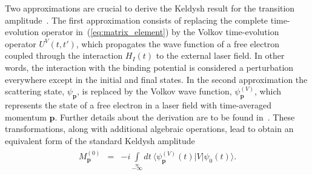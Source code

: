Two approximations are crucial to derive the Keldysh result for the
transition amplitude~\cite{Kopold_1997sfa}. The first approximation
consists of replacing the complete time-evolution operator
in~(\ref{eq:matrix_element}) by the Volkov time-evolution operator
$U^{V}(t,t')$, which propagates the wave function of a free electron
coupled through the interaction $H_{I}(t)$ to the external laser
field. In other words, the interaction with the binding potential is
considered a perturbation everywhere except in the initial and final
states. In the second approximation the scattering state,
$\psi_{\mathbf{p}}$, is replaced by the Volkov wave function,
$\psi_{\mathbf{p}}^{(V)}$, which represents the state of a free
electron in a laser field with time-averaged momentum
$\mathbf{p}$. Further details about the derivation are to be found
in~\cite{Kopold_1997sfa}. These transformations, along with additional
algebraic operations, lead to obtain an equivalent form of the
standard Keldysh amplitude~\cite{Kopold_1997sfa, Becker_1997}
\begin{eqnarray}
\label{eq:keldysh_amp}
\begin{split}
M_{\mathbf{p}}^{(0)} & = &
-i \int\limits_{-\infty}\limits^{\infty}
dt\ \langle \psi_{\mathbf{p}}^{(V)}(t) | V | \psi_{0}(t) \rangle.
\end{split}
\end{eqnarray}

